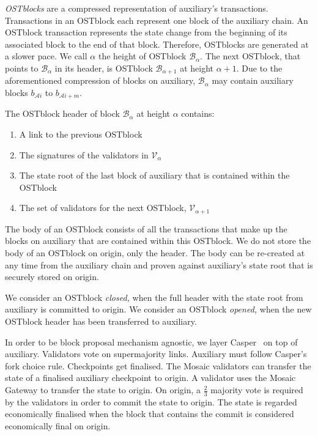\documentclass[12pt,a4paper]{article}
\newcommand{\A}{\mathcal{A}}
\newcommand{\V}{\mathcal{V}}
\newcommand{\B}{\mathcal{B}}
\begin{document}
\emph{OSTblocks} are a compressed representation of auxiliary's transactions.
Transactions in an OSTblock each represent one block of the auxiliary chain.
An OSTblock transaction represents the state change from the beginning of its associated block to the end of that block.
Therefore, OSTblocks are generated at a slower pace.
We call $\alpha$ the height of OSTblock $\B_\alpha$.
The next OSTblock, that points to $\B_\alpha$ in its header,
is OSTblock $\B_{\alpha+1}$ at height $\alpha+1$.
Due to the aforementioned compression of blocks on auxiliary,
$\B_\alpha$ may contain auxiliary blocks $b_{\A{}i}$ to $b_{\A{}i+m}$.

The OSTblock header of block $\B_\alpha$ at height $\alpha$ contains:
\begin{enumerate}
	\item A link to the previous OSTblock
	\item The signatures of the validators in $\V_\alpha$
	\item The state root of the last block of auxiliary that is contained within the OSTblock
	\item The set of validators for the next OSTblock, $\V_{\alpha+1}$
\end{enumerate}
The body of an OSTblock consists of all the transactions that make up the blocks on auxiliary that are contained within this OSTblock.
We do not store the body of an OSTblock on origin, only the header.
The body can be re-created at any time from the auxiliary chain and proven against auxiliary's state root that is securely stored on origin.

We consider an OSTblock \emph{closed,} when the full header with the state root from auxiliary is committed to origin.
We consider an OSTblock \emph{opened,} when the new OSTblock header has been transferred to auxiliary.

In order to be block proposal mechanism agnostic, we layer Casper~\cite{casperffg} on top of auxiliary.
Validators vote on supermajority links.
Auxiliary must follow Casper's fork choice rule.
Checkpoints get finalised.
The Mosaic validators can transfer the state of a finalised auxiliary checkpoint to origin.
A validator uses the Mosaic Gateway to transfer the state to origin.
On origin, a $\frac{2}{3	}$ majority vote is required by the validators in order to commit the state to origin.
The state is regarded economically finalised when the block that contains the commit is considered economically final on origin.
\end{document}

